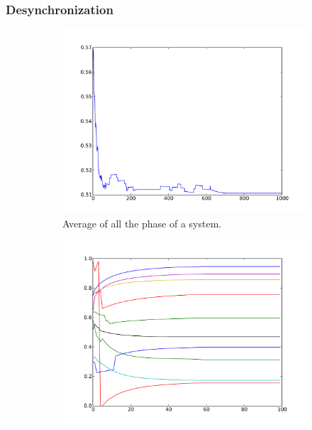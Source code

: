 \documentclass{beamer}
\begin{document}
\subsubsection{Desynchronization}
\begin{frame}
\begin{figure}[t]
	\centering
	\begin{subfigure}[h]{0.4\textwidth}
		\includegraphics[width=\linewidth]{Figure/phase_avg.pdf}
		\caption{\footnotesize{Average of all the phase of a system.}}\label{fig:Phase_avg}
	\end{subfigure}%
	\hspace{20pt}
	\begin{subfigure}[h]{0.4\textwidth}
		\includegraphics[width=\linewidth]{Figure/dyn_conv.pdf}

\end{subfigure}
\end{figure}
\end{frame}
\end{document}
